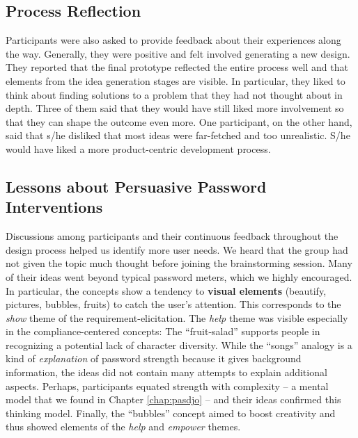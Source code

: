 \subsection{Process Reflection}
Participants were also asked to provide feedback about their experiences along the way. Generally, they were positive and felt involved generating a new design. They reported that the final prototype reflected the entire process well and that elements from the idea generation stages are visible. In particular, they liked to think about finding solutions to a problem that they had not thought about in depth. Three of them said that they would have still liked more involvement so that they can shape the outcome even more. One participant, on the other hand, said that s/he disliked that most ideas were far-fetched and too unrealistic. S/he would have liked a more product-centric development process.

\subsection{Lessons about Persuasive Password Interventions}
Discussions among participants and their continuous feedback throughout the design process helped us identify more user needs. We heard that the group had not given the topic much thought before joining the brainstorming session. Many of their ideas went beyond typical password meters, which we highly encouraged. In particular, the concepts show a tendency to \textbf{visual elements} (beautify, pictures, bubbles, fruits) to catch the user's attention. This corresponds to the \textit{show} theme of the requirement-elicitation. The \textit{help} theme was visible especially in the compliance-centered concepts: The ``fruit-salad'' supports people in recognizing a potential lack of character diversity. While the ``songs'' analogy is a kind of \textit{explanation} of password strength because it gives background information, the ideas did not contain many attempts to explain additional aspects. Perhaps, participants equated strength with complexity -- a mental model that we found in Chapter \ref{chap:pasdjo} -- and their ideas confirmed this thinking model. Finally, the ``bubbles'' concept aimed to boost creativity and thus showed elements of the \textit{help} and \textit{empower} themes. 

